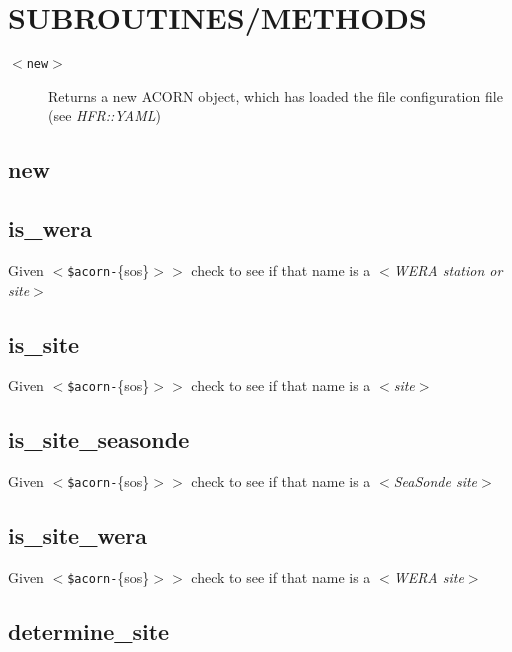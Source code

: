 \section{SUBROUTINES/METHODS\label{SUBROUTINES_METHODS}}
\begin{description}

\item[{\texttt{$<$new}$>$}] \mbox{}

Returns a new ACORN object, which has loaded the file configuration file (see \emph{HFR::YAML})

\end{description}
\subsection*{new\label{new}}
\subsection*{is\_wera\label{is_wera}}


Given \texttt{$<$\$acorn-}\{sos\}$>$$>$ check to see if that name is a \textit{$<$WERA station or site}$>$

\subsection*{is\_site\label{is_site}}


Given \texttt{$<$\$acorn-}\{sos\}$>$$>$ check to see if that name is a \textit{$<$site}$>$

\subsection*{is\_site\_seasonde\label{is_site_seasonde}}


Given \texttt{$<$\$acorn-}\{sos\}$>$$>$ check to see if that name is a \textit{$<$SeaSonde site}$>$

\subsection*{is\_site\_wera\label{is_site_wera}}


Given \texttt{$<$\$acorn-}\{sos\}$>$$>$ check to see if that name is a \textit{$<$WERA site}$>$

\subsection*{determine\_site\label{determine_site}}


